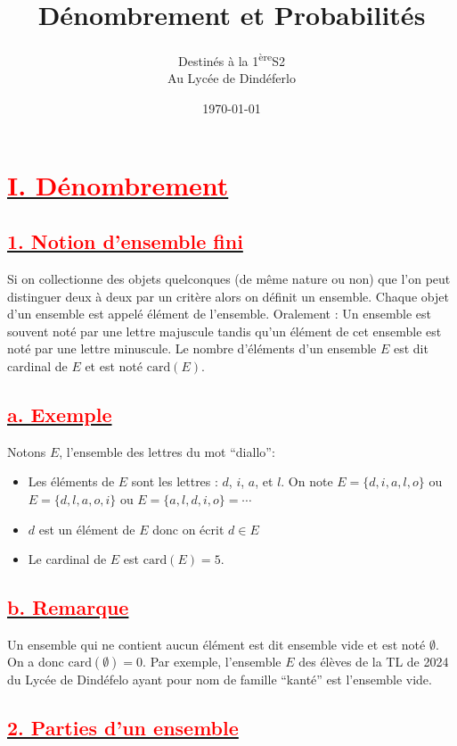 \documentclass[12pt]{article}
\author{Destinés à la 1\textsuperscript{ère}S2\\Au Lycée de Dindéferlo}
\title{\textbf{Dénombrement et Probabilités}}
\date{\today}
\begin{document}
\maketitle
\newpage
\section*{\underline{\textbf{\textcolor{red}{I. Dénombrement}}}}
\subsection*{\underline{\textbf{\textcolor{red}{1. Notion d’ensemble fini}}}}
Si on collectionne des objets quelconques (de même nature ou non) que l’on peut distinguer deux à deux 
par un critère alors on définit un ensemble. Chaque objet d’un ensemble est appelé élément de l’ensemble. 
Oralement : Un ensemble est souvent noté par une lettre majuscule tandis qu’un élément de cet 
ensemble est noté par une lettre minuscule. Le nombre d’éléments d’un ensemble \(E\) est dit cardinal 
de \(E\) et est noté \(\text{card} (E)\).
\subsection*{\underline{\textbf{\textcolor{red}{a. Exemple}}}}
Notons \(E\), l’ensemble des lettres du mot ``diallo'':
\begin{itemize}
    \item Les éléments de \(E\) sont les lettres : \(d\), \(i\), \(a\), et \(l\). On note \(E = \{d, i, a, l, o\}\) ou 
    \(E = \{d, l, a, o, i\}\) ou \(E = \{a, l, d, i, o\} = \cdots\)
    \item \(d\) est un élément de \(E\) donc on écrit \(d \in E\) %
    \item Le cardinal de \(E\) est \(\text{card}(E) = 5\).
\end{itemize}
\subsection*{\underline{\textbf{\textcolor{red}{b. Remarque}}}}
Un ensemble qui ne contient aucun élément est dit ensemble vide et est noté \(\emptyset\). On a donc 
\(\text{card}(\emptyset) = 0\). Par exemple, l’ensemble \(E\) des élèves de la TL de 2024 du Lycée de 
Dindéfelo ayant pour nom de famille ``kanté'' est l’ensemble vide.
\subsection*{\underline{\textbf{\textcolor{red}{2. Parties d’un ensemble}}}}
\end{document}
